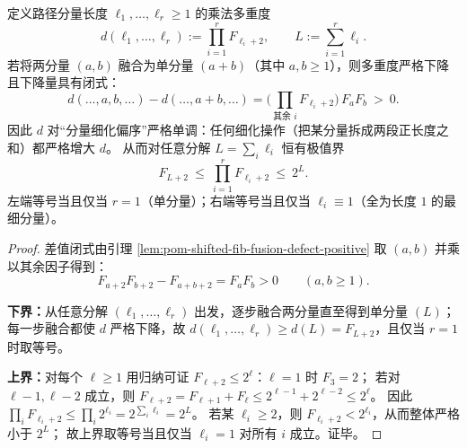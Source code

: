 \begin{proposition}[路径分量乘法多重度的细化单调性与极值界]\label{prop:pom-path-component-multiplicity-refinement-monotone-extrema}
定义路径分量长度 \(\ell_1,\dots,\ell_r\ge 1\) 的乘法多重度
\[
d(\ell_1,\dots,\ell_r):=\prod_{i=1}^r F_{\ell_i+2},
\qquad
L:=\sum_{i=1}^r \ell_i.
\]
若将两分量 \((a,b)\) 融合为单分量 \((a+b)\)（其中 \(a,b\ge 1\)），则多重度严格下降且下降量具有闭式：
\[
\boxed{\;
d(\ldots,a,b,\ldots)-d(\ldots,a+b,\ldots)
=\Big(\prod_{\text{其余 }i}F_{\ell_i+2}\Big)\,F_aF_b\ >\ 0.\;}
\]
因此 \(d\) 对“分量细化偏序”严格单调：任何细化操作（把某分量拆成两段正长度之和）都严格增大 \(d\)。
从而对任意分解 \(L=\sum_i\ell_i\) 恒有极值界
\[
\boxed{\;
F_{L+2}\ \le\ \prod_{i=1}^r F_{\ell_i+2}\ \le\ 2^L.\;}
\]
左端等号当且仅当 \(r=1\)（单分量）；右端等号当且仅当 \(\ell_i\equiv 1\)（全为长度 \(1\) 的最细分量）。
\end{proposition}
\begin{proof}
差值闭式由引理 \ref{lem:pom-shifted-fib-fusion-defect-positive} 取 \((a,b)\) 并乘以其余因子得到：
\[
F_{a+2}F_{b+2}-F_{a+b+2}=F_aF_b>0\qquad(a,b\ge 1).
\]
\par
\textbf{下界：}从任意分解 \((\ell_1,\dots,\ell_r)\) 出发，逐步融合两分量直至得到单分量 \((L)\)；
每一步融合都使 \(d\) 严格下降，故
\(
d(\ell_1,\dots,\ell_r)\ge d(L)=F_{L+2}
\)，且仅当 \(r=1\) 时取等号。
\par
\textbf{上界：}对每个 \(\ell\ge 1\) 用归纳可证 \(F_{\ell+2}\le 2^\ell\)：\(\ell=1\) 时 \(F_3=2\)；
若对 \(\ell-1,\ell-2\) 成立，则
\(
F_{\ell+2}=F_{\ell+1}+F_\ell\le 2^{\ell-1}+2^{\ell-2}\le 2^\ell
\)。
因此
\(
\prod_i F_{\ell_i+2}\le \prod_i 2^{\ell_i}=2^{\sum_i\ell_i}=2^L
\)。
若某 \(\ell_i\ge 2\)，则 \(F_{\ell_i+2}<2^{\ell_i}\)，从而整体严格小于 \(2^L\)；
故上界取等号当且仅当 \(\ell_i=1\) 对所有 \(i\) 成立。证毕。
\end{proof}

